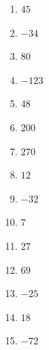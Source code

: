 %
%
    \begin{enumerate}[cols=4]
        \item \(45\)
        \item \(-34\)
        \item \(80\)
        \item \(-123\)
        \item \(48\)
        \item \(200\)
        \item \(270\)
        \item \(12\)
        \item \(-32\)
        \item \(7\)
        \item \(27\)
        \item \(69\)
        \item \(-25\)
        \item \(18\)
        \item \(-72\)
    \end{enumerate}
